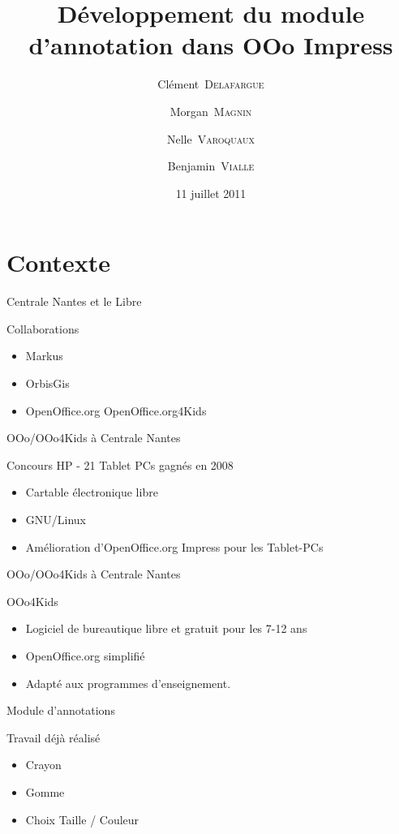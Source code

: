 \documentclass[handout]{beamer}
\title{Développement du module d'annotation dans OOo Impress}
\author{Clément~\textsc{Delafargue} \and Morgan~\textsc{Magnin} \and Nelle~\textsc{Varoquaux}\and Benjamin~\textsc{Vialle}}
\institute[\textsc{ECN}]{École Centrale de Nantes}
\date{11 juillet 2011}
\begin{document}
\frame{\titlepage}

\section{Contexte}

\begin{frame}{Centrale Nantes et le Libre}
	\begin{block}{Collaborations}
		\begin{itemize}[<+->]
			\item Markus
			\item OrbisGis
			\item OpenOffice.org OpenOffice.org4Kids
		\end{itemize}
	\end{block}
\end{frame}

\begin{frame}{OOo/OOo4Kids à Centrale Nantes}
	\begin{block}{Concours HP - 21 Tablet PCs gagnés en 2008}
		\begin{itemize}[<+->]
            \item Cartable électronique libre
            \item GNU/Linux
            \item Amélioration d'OpenOffice.org Impress pour les Tablet-PCs
		\end{itemize}
	\end{block}
\end{frame}

\begin{frame}{OOo/OOo4Kids à Centrale Nantes}
	\begin{block}{OOo4Kids}
		\begin{itemize}[<+->]
            \item Logiciel de bureautique libre et gratuit pour les 7-12 ans
            \item OpenOffice.org simplifié
            \item Adapté aux programmes d'enseignement.
		\end{itemize}
	\end{block}
\end{frame}

\begin{frame}{Module d'annotations}
    \begin{block}{Travail déjà réalisé}
        \begin{itemize}[<+->]
            \item Crayon
            \item Gomme
            \item Choix Taille / Couleur
        \end{itemize}
    \end{block}
\end{frame}
\end{document}
